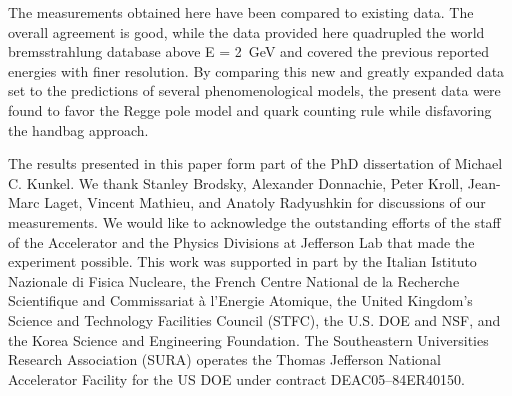 \documentclass[aps,prc,twocolumn,floatfix,showpacs,preprintnumbers,amsmath,amssymb,superscriptaddress]{revtex4-1}
\begin{document}
The measurements obtained here have been compared to
existing data. The overall agreement is good, while the 
data provided here quadrupled the world bremsstrahlung 
database above E = 2~GeV and covered the previous reported energies with finer 
resolution. By comparing this new and greatly expanded data 
set to the predictions of several phenomenological models, 
the present data were found to favor the Regge pole model 
and quark counting rule while disfavoring the 
handbag approach.  

The results presented in this paper form part 
of the PhD dissertation of Michael C. Kunkel.
We thank Stanley Brodsky, Alexander Donnachie, 
Peter Kroll, Jean-Marc Laget, Vincent Mathieu, 
and Anatoly Radyushkin for discussions of our 
measurements. We would like to acknowledge the outstanding 
efforts of the staff of the Accelerator and the Physics 
Divisions at Jefferson Lab that made the experiment possible.  
This work was supported in part by the Italian Istituto 
Nazionale di Fisica Nucleare, the French Centre National de 
la Recherche Scientifique and Commissariat \`a l'Energie 
Atomique, the United Kingdom's Science and Technology 
Facilities Council (STFC), the U.S. DOE and NSF, and the 
Korea Science and Engineering Foundation. The Southeastern 
Universities Research Association (SURA) operates the Thomas 
Jefferson National Accelerator Facility for the US DOE under 
contract DEAC05--84ER40150.
\end{document}
